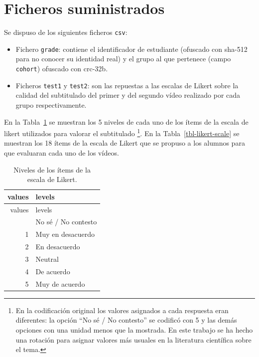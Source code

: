 \documentclass[
  12pt,
  a4paper,
  extrafontsizes,
  onecolumn,
  openright,
  table]{memoir}
\providecommand{\tightlist}{%
  \setlength{\itemsep}{0pt}\setlength{\parskip}{0pt}}\usepackage{longtable,booktabs,array}
\begin{document}
\hypertarget{ficheros-suministrados}{%
\section{Ficheros suministrados}\label{ficheros-suministrados}}

Se dispuso de los siguientes ficheros \texttt{csv}:

\begin{itemize}
\tightlist
\item
  Fichero \texttt{grade}: contiene el identificador de estudiante
  (ofuscado con \gls{sha}-512 para no conocer su identidad real) y el
  grupo al que pertenece (campo \texttt{cohort}) ofuscado con
  \gls{crc}-32b.
\item
  Ficheros \texttt{test1} y \texttt{test2}: son las repuestas a las
  escalas de Likert sobre la calidad del subtitulado del primer y del
  segundo vídeo realizado por cada grupo respectivamente.
\end{itemize}

En la Tabla~\ref{tbl-likert-levels} se muestran los 5 niveles de cada
uno de los ítems de la \gls{escala de likert} utilizados para valorar el
subtitulado \footnote{En la codificación original los valores asignados
  a cada respuesta eran diferentes: la opción \enquote{No sé / No
  contesto} se codificó con 5 y las demás opciones con una unidad menos
  que la mostrada. En este trabajo se ha hecho una rotación para asignar
  valores más usuales en la literatura científica sobre el tema.}. En la
Tabla~\ref{tbl-likert-scale} se muestran los 18 ítems de la escala de
Likert que se propuso a los alumnos para que evaluaran cada uno de los
vídeos.

\hypertarget{tbl-likert-levels}{}
\begin{longtable}[]{@{}rl@{}}
\caption{\label{tbl-likert-levels}Niveles de los ítems de la escala de
Likert.}\tabularnewline
\toprule\noalign{}
values & levels \\
\midrule\noalign{}
\endfirsthead
\toprule\noalign{}
values & levels \\
\midrule\noalign{}
\endhead
\bottomrule\noalign{}
\endlastfoot
0 & No sé / No contesto \\
1 & Muy en desacuerdo \\
2 & En desacuerdo \\
3 & Neutral \\
4 & De acuerdo \\
5 & Muy de acuerdo \\
\end{longtable}
\end{document}
